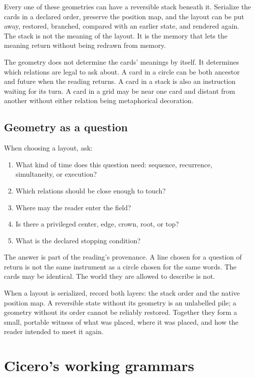 Every one of these geometries can have a reversible stack beneath it. Serialize
the cards in a declared order, preserve the position map, and the layout can be
put away, restored, branched, compared with an earlier state, and rendered
again. The stack is not the meaning of the layout. It is the memory that lets
the meaning return without being redrawn from memory.

The geometry does not determine the cards' meanings by itself. It determines
which relations are legal to ask about. A card in a circle can be both ancestor
and future when the reading returns. A card in a stack is also an instruction
waiting for its turn. A card in a grid may be near one card and distant from
another without either relation being metaphorical decoration.

\subsection{Geometry as a question}

When choosing a layout, ask:

\begin{enumerate}
\item What kind of time does this question need: sequence, recurrence,
      simultaneity, or execution?
\item Which relations should be close enough to touch?
\item Where may the reader enter the field?
\item Is there a privileged center, edge, crown, root, or top?
\item What is the declared stopping condition?
\end{enumerate}

The answer is part of the reading's provenance. A line chosen for a question of
return is not the same instrument as a circle chosen for the same words. The
cards may be identical. The world they are allowed to describe is not.

When a layout is serialized, record both layers: the stack order and the native
position map. A reversible state without its geometry is an unlabelled pile; a
geometry without its order cannot be reliably restored. Together they form a
small, portable witness of what was placed, where it was placed, and how the
reader intended to meet it again.

\section{Cicero's working grammars}

